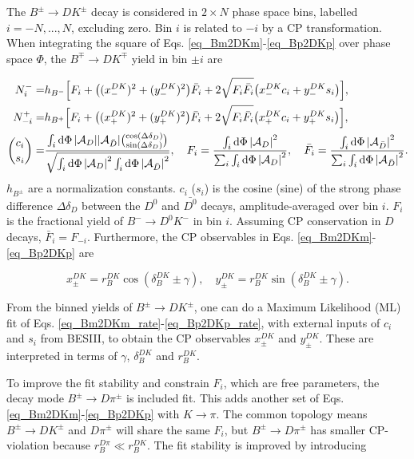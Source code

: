 \documentclass[12pt, a4paper, notitlepage, onecolumn]{article}
\begin{document}
The $B^\pm\to DK^\pm$ decay is considered in $2\times N$ phase space bins, labelled $i = -N, ..., N$, excluding zero. Bin $i$ is related to $-i$ by a CP transformation. When integrating the square of Eqs. \eqref{eq_Bm2DKm}-\eqref{eq_Bp2DKp} over phase space $\Phi$, the $B^\mp\to DK^\mp$ yield in bin $\pm i$ are

\begin{align}
  N^-_i =& h_{B^-}\Big[F_i + \big((x_-^{DK})^2 + (y_-^{DK})^2\big)\bar{F}_i + 2\sqrt{F_i\bar{F}_i}\big(x_-^{DK}c_i + y_-^{DK}s_i\big)\Big], \label{eq_Bm2DKm_rate} \\
  N^+_{-i} =& h_{B^+}\Big[F_i + \big((x_+^{DK})^2 + (y_+^{DK})^2\big)\bar{F}_i + 2\sqrt{F_i\bar{F}_i}\big(x_+^{DK}c_i + y_+^{DK}s_i\big)\Big], \label{eq_Bp2DKp_rate} \\
  {c_i\choose s_i} =& \frac{\int_i\dd{\Phi}\abs{\mathcal{A}_D}\abs{\mathcal{A}_{\bar{D}}}{\cos(\Delta\delta_D)\choose\sin(\Delta\delta_D)}}{\sqrt{\int_i\dd{\Phi}\abs{\mathcal{A}_D}^2\int_i\dd{\Phi}\abs{\mathcal{A}_{\bar{D}}}^2}}, \quad F_i = \frac{\int_i\dd{\Phi}\abs{\mathcal{A}_D}^2}{\sum_i\int_i\dd{\Phi}\abs{\mathcal{A}_D}^2}, \quad \bar{F}_i = \frac{\int_i\dd{\Phi}\abs{\mathcal{A}_{\bar{D}}}^2}{\sum_i\int_i\dd{\Phi}\abs{\mathcal{A}_{\bar{D}}}^2}. \label{eq_hadronic_parameters}
\end{align}
$h_{B^\pm}$ are a normalization constants. $c_i$ ($s_i$) is the cosine (sine) of the strong phase difference $\Delta\delta_D$ between the $D^0$ and $\bar{D^0}$ decays, amplitude-averaged over bin $i$. $F_i$ is the fractional yield of $B^-\to D^0K^-$ in bin $i$. Assuming CP conservation in $D$ decays, $\bar{F}_i = F_{-i}$. Furthermore, the CP observables in Eqs. \eqref{eq_Bm2DKm}-\eqref{eq_Bp2DKp} are

\begin{equation}
  x_\pm^{DK} = r_B^{DK}\cos(\delta_B^{DK}\pm\gamma), \quad  y_\pm^{DK} = r_B^{DK}\sin(\delta_B^{DK}\pm\gamma).
  \label{eq_xy_cp}
\end{equation}

From the binned yields of $B^\pm\to DK^\pm$, one can do a Maximum Likelihood (ML) fit of Eqs. \eqref{eq_Bm2DKm_rate}-\eqref{eq_Bp2DKp_rate}, with external inputs of $c_i$ and $s_i$ from BESIII, to obtain the CP observables $x_\pm^{DK}$ and $y_\pm^{DK}$. These are interpreted in terms of $\gamma$, $\delta_B^{DK}$ and $r_B^{DK}$.

To improve the fit stability and constrain $F_i$, which are free parameters, the decay mode $B^\pm\to D\pi^\pm$ is included fit. This adds another set of Eqs. \eqref{eq_Bm2DKm}-\eqref{eq_Bp2DKp} with $K\to\pi$. The common topology means $B^\pm\to DK^\pm$ and $D\pi^\pm$ will share the same $F_i$, but $B^\pm\to D\pi^\pm$ has smaller CP-violation because $r_B^{D\pi}\ll r_B^{DK}$. The fit stability is improved by introducing
\end{document}
